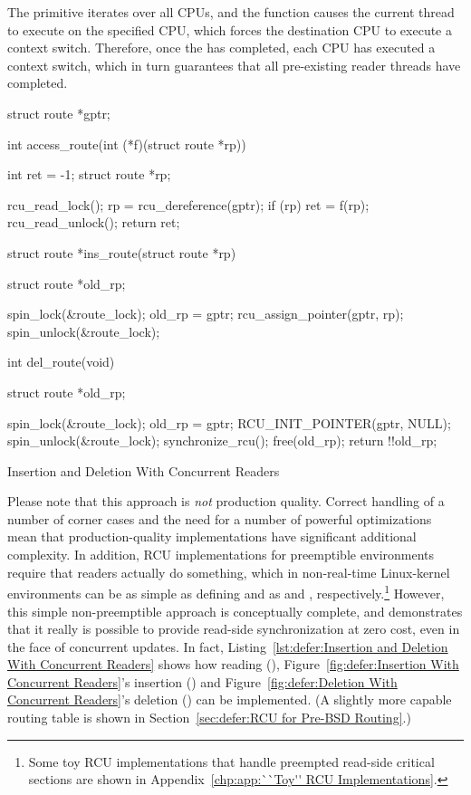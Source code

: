 The  primitive iterates over all CPUs, and
the  function causes the current thread to
execute on the specified CPU, which forces the destination CPU to execute
a context switch.
Therefore, once the  has completed, each CPU
has executed a context switch, which in turn guarantees that
all pre-existing reader threads have completed.

\begin{listing}[tbp]
{ \scriptsize
\begin{verbbox}[\LstLineNo]
struct route *gptr;

int access_route(int (*f)(struct route *rp))
{
  int ret = -1;
  struct route *rp;

  rcu_read_lock();
  rp = rcu_dereference(gptr);
  if (rp)
  	ret = f(rp);
  rcu_read_unlock();
  return ret;
}

struct route *ins_route(struct route *rp)
{
  struct route *old_rp;

  spin_lock(&route_lock);
  old_rp = gptr;
  rcu_assign_pointer(gptr, rp);
  spin_unlock(&route_lock);
}

int del_route(void)
{
  struct route *old_rp;

  spin_lock(&route_lock);
  old_rp = gptr;
  RCU_INIT_POINTER(gptr, NULL);
  spin_unlock(&route_lock);
  synchronize_rcu();
  free(old_rp);
  return !!old_rp;
}
\end{verbbox}
}
\centering
\theverbbox
\caption{Insertion and Deletion With Concurrent Readers}
\label{lst:defer:Insertion and Deletion With Concurrent Readers}
\end{listing}

Please note that this approach is \emph{not} production quality.
Correct handling of a number of corner cases and the need for a number
of powerful optimizations mean that production-quality implementations
have significant additional complexity.
In addition, RCU implementations for preemptible environments
require that readers actually do something, which in non-real-time
Linux-kernel environments can be as simple as defining
 and  as 
and , respectively.\footnote{
	Some toy RCU implementations that handle preempted
	read-side critical sections are shown in
	Appendix~\ref{chp:app:``Toy'' RCU Implementations}.}
However, this simple non-preemptible approach is conceptually complete,
and demonstrates that it really is possible to provide read-side
synchronization at zero cost, even in the face of concurrent updates.
In fact,
Listing~\ref{lst:defer:Insertion and Deletion With Concurrent Readers}
shows how reading (),
Figure~\ref{fig:defer:Insertion With Concurrent Readers}'s
insertion () and
Figure~\ref{fig:defer:Deletion With Concurrent Readers}'s
deletion () can
be implemented.
(A slightly more capable routing table is shown in
Section~\ref{sec:defer:RCU for Pre-BSD Routing}.)

